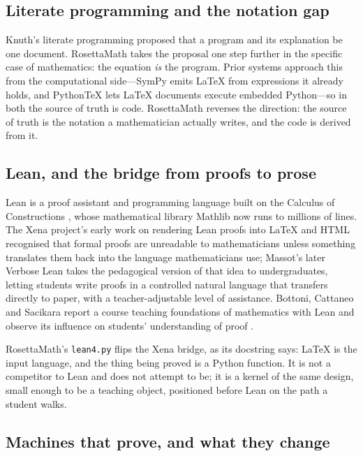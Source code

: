 \documentclass[11pt]{article}
\begin{document}
\subsection{Literate programming and the notation gap}

Knuth's literate programming \cite{knuth} proposed that a program and its
explanation be one document. RosettaMath takes the proposal one step further
in the specific case of mathematics: the equation \emph{is} the program. Prior
systems approach this from the computational side---SymPy \cite{meurer} emits
\LaTeX{} from expressions it already holds, and PythonTeX \cite{poore} lets
\LaTeX{} documents execute embedded Python---so in both the source of truth is
code. RosettaMath reverses the direction: the source of truth is the notation a
mathematician actually writes, and the code is derived from it.

\subsection{Lean, and the bridge from proofs to prose}

Lean \cite{demoura2021} is a proof assistant and programming language built on
the Calculus of Constructions \cite{coquand1988}, whose mathematical library
Mathlib now runs to millions of lines. The Xena project's early work on
rendering Lean proofs into \LaTeX{} and HTML \cite{massot2019} recognised that
formal proofs are unreadable to mathematicians unless something translates
them back into the language mathematicians use; Massot's later Verbose Lean
\cite{massot2024} takes the pedagogical version of that idea to
undergraduates, letting students write proofs in a controlled natural language
that transfers directly to paper, with a teacher-adjustable level of
assistance. Bottoni, Cattaneo and Sacikara report a course teaching foundations
of mathematics with Lean and observe its influence on students' understanding
of proof \cite{bottoni2025}.

RosettaMath's \texttt{lean4.py} flips the Xena bridge, as its docstring says:
\LaTeX{} is the input language, and the thing being proved is a Python
function. It is not a competitor to Lean and does not attempt to be; it is a
kernel of the same design, small enough to be a teaching object, positioned
before Lean on the path a student walks.

\subsection{Machines that prove, and what they change}
\end{document}
